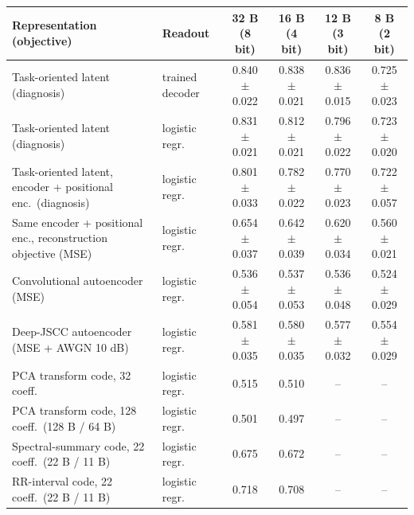 \begin{tabular}{llcccc}
\toprule
Representation (objective) & Readout & 32 B (8 bit) & 16 B (4 bit) & 12 B (3 bit) & 8 B (2 bit) \\
\midrule
Task-oriented latent (diagnosis) & trained decoder & 0.840 $\pm$ 0.022 & 0.838 $\pm$ 0.021 & 0.836 $\pm$ 0.015 & 0.725 $\pm$ 0.023 \\
Task-oriented latent (diagnosis) & logistic regr. & 0.831 $\pm$ 0.021 & 0.812 $\pm$ 0.021 & 0.796 $\pm$ 0.022 & 0.723 $\pm$ 0.020 \\
Task-oriented latent, encoder + positional enc.\ (diagnosis) & logistic regr. & 0.801 $\pm$ 0.033 & 0.782 $\pm$ 0.022 & 0.770 $\pm$ 0.023 & 0.722 $\pm$ 0.057 \\
Same encoder + positional enc., reconstruction objective (MSE) & logistic regr. & 0.654 $\pm$ 0.037 & 0.642 $\pm$ 0.039 & 0.620 $\pm$ 0.034 & 0.560 $\pm$ 0.021 \\
Convolutional autoencoder (MSE) & logistic regr. & 0.536 $\pm$ 0.054 & 0.537 $\pm$ 0.053 & 0.536 $\pm$ 0.048 & 0.524 $\pm$ 0.029 \\
Deep-JSCC autoencoder (MSE + AWGN 10 dB) & logistic regr. & 0.581 $\pm$ 0.035 & 0.580 $\pm$ 0.035 & 0.577 $\pm$ 0.032 & 0.554 $\pm$ 0.029 \\
PCA transform code, 32 coeff.\ & logistic regr. & 0.515 & 0.510 & -- & -- \\
PCA transform code, 128 coeff.\ (128 B / 64 B) & logistic regr. & 0.501 & 0.497 & -- & -- \\
Spectral-summary code, 22 coeff.\ (22 B / 11 B) & logistic regr. & 0.675 & 0.672 & -- & -- \\
RR-interval code, 22 coeff.\ (22 B / 11 B) & logistic regr. & 0.718 & 0.708 & -- & -- \\
\bottomrule
\end{tabular}
